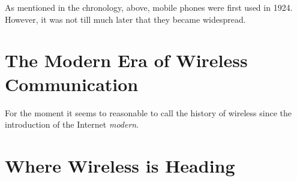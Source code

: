 As mentioned in the chronology, above, mobile phones were first used in 1924. However,
it was not till much later that they became widespread. \\[5mm]
%

\section{The Modern Era of Wireless Communication}

For the moment it seems to reasonable to call the history of wireless since the introduction 
of the Internet {\em modern}.

\section{Where Wireless is Heading}
